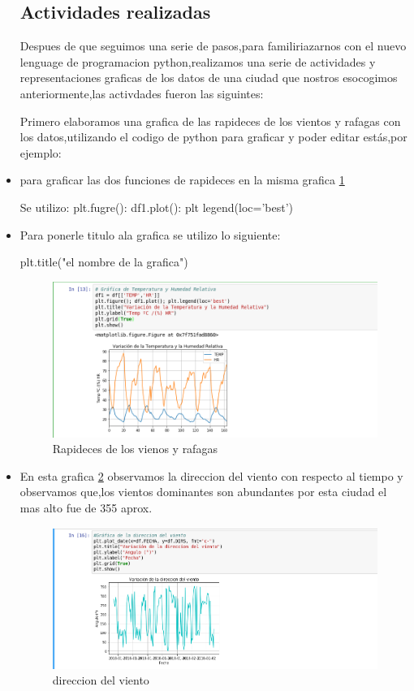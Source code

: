 \documentclass{article}
\begin{document}
\begin{itemize}
\subsection{Actividades realizadas}

Despues de que seguimos una serie de pasos,para familiriazarnos con el nuevo lenguage de programacion python,realizamos una serie de actividades y representaciones graficas de los datos de una ciudad que nostros esocogimos  anteriormente,las activdades fueron las siguintes:

Primero elaboramos una grafica de las rapideces de los vientos y rafagas con los datos,utilizando el codigo de python para graficar y poder editar estás,por ejemplo:
\item  para graficar las dos funciones de rapideces en la misma grafica \ref{fig:grafica1}

Se utilizo: plt.fugre(): df1.plot(): plt legend(loc='best')

\item Para ponerle titulo ala grafica se utilizo lo siguiente:

plt.title("el nombre de la grafica")

\begin{figure}[ht!]
 \includegraphics[width=\linewidth]{2.png}
 \caption{Rapideces de los vienos y rafagas}
 \label{fig:grafica1}
 \end{figure}

\item En esta grafica \ref{fig:grafica2} observamos la direccion del viento con respecto al tiempo y observamos que,los vientos dominantes son abundantes por esta ciudad el mas alto fue de 355 aprox.

\begin{figure}[ht!]
 \includegraphics[width=\linewidth]{3.png}
  \caption{direccion del viento}
 \label{fig:grafica2}
 \end{figure}


\end{itemize}
\end{document}
